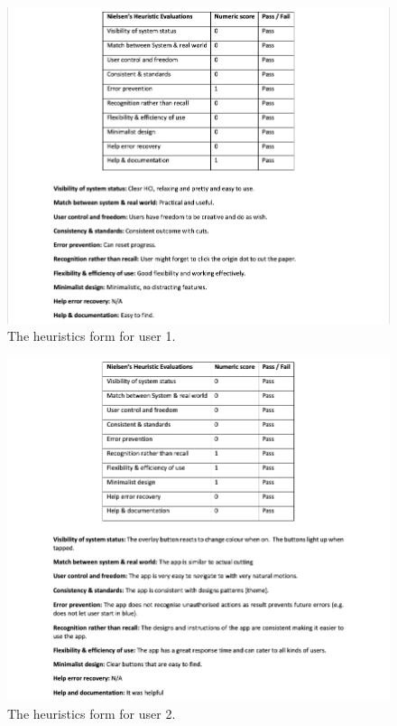 \documentclass[11pt]{article}
\begin{document}
    \begin{figure}[!ht]
            \centering
            \includegraphics[width=1\linewidth]{Images/User1}
            \caption{The heuristics form for user 1.}
            \label{fig:user1}
    \end{figure}
    \begin{figure}[!ht]
            \centering
            \includegraphics[width=1\linewidth]{Images/User2}
            \caption{The heuristics form for user 2.}
            \label{fig:user2}
    \end{figure}    
\end{document}
